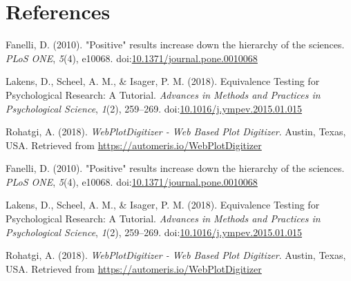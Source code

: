 \documentclass[british,,man,floatsintext]{apa6}
\begin{document}
\hypertarget{references}{%
\section{References}\label{references}}

\setlength{\parindent}{-0.5in}
\setlength{\leftskip}{0.5in}

\hypertarget{refs}{}
\leavevmode\hypertarget{ref-Fanelli2010}{}%
Fanelli, D. (2010). "Positive" results increase down the hierarchy of the sciences. \emph{PLoS ONE}, \emph{5}(4), e10068. doi:\href{https://doi.org/10.1371/journal.pone.0010068}{10.1371/journal.pone.0010068}

\leavevmode\hypertarget{ref-Lakens2018a}{}%
Lakens, D., Scheel, A. M., \& Isager, P. M. (2018). Equivalence Testing for Psychological Research: A Tutorial. \emph{Advances in Methods and Practices in Psychological Science}, \emph{1}(2), 259--269. doi:\href{https://doi.org/10.1016/j.ympev.2015.01.015}{10.1016/j.ympev.2015.01.015}

\leavevmode\hypertarget{ref-Rohatgi2018}{}%
Rohatgi, A. (2018). \emph{WebPlotDigitizer - Web Based Plot Digitizer}. Austin, Texas, USA. Retrieved from \url{https://automeris.io/WebPlotDigitizer}

\leavevmode\hypertarget{ref-Fanelli2010}{}%
Fanelli, D. (2010). "Positive" results increase down the hierarchy of the sciences. \emph{PLoS ONE}, \emph{5}(4), e10068. doi:\href{https://doi.org/10.1371/journal.pone.0010068}{10.1371/journal.pone.0010068}

\leavevmode\hypertarget{ref-Lakens2018a}{}%
Lakens, D., Scheel, A. M., \& Isager, P. M. (2018). Equivalence Testing for Psychological Research: A Tutorial. \emph{Advances in Methods and Practices in Psychological Science}, \emph{1}(2), 259--269. doi:\href{https://doi.org/10.1016/j.ympev.2015.01.015}{10.1016/j.ympev.2015.01.015}

\leavevmode\hypertarget{ref-Rohatgi2018}{}%
Rohatgi, A. (2018). \emph{WebPlotDigitizer - Web Based Plot Digitizer}. Austin, Texas, USA. Retrieved from \url{https://automeris.io/WebPlotDigitizer}
\end{document}
